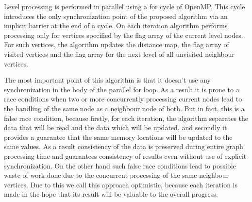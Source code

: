 \documentclass[letterpaper]{article}
\begin{document}
			Level processing is performed in parallel using a for cycle of OpenMP.
			This cycle introduces the only synchronization point of the proposed algorithm via an implicit barrier at the end of a cycle.
			On each iteration algorithm performs processing only for vertices specified by the flag array of the current level nodes.
			For such vertices, the algorithm updates the distance map, the flag array of visited vertices and the flag array for the next level of all unvisited neighbour vertices.
			
			The most important point of this algorithm is that it doesn't use any synchronization in the body of the parallel for loop.
			As a result it is prone to a race conditions when two or more concurrently processing current nodes lead to the handling of the same node as a neighbour node of both.
			But in fact, this is a false race condition, because firstly, for each iteration, the algorithm separates the data that will be read and the data which will be updated, and secondly it provides a guarantee that the same memory locations will be updated to the same values.
			As a result consistency of the data is preserved during entire graph processing time and guarantees consistency of results even without use of explicit synchronization.
			On the other hand such false race conditions lead to possible waste of work done due to the concurrent processing of the same neighbour vertices.
			Due to this we call this approach optimistic, because each iteration is made in the hope that its result will be valuable to the overall progress.  
			
			
\end{document}
